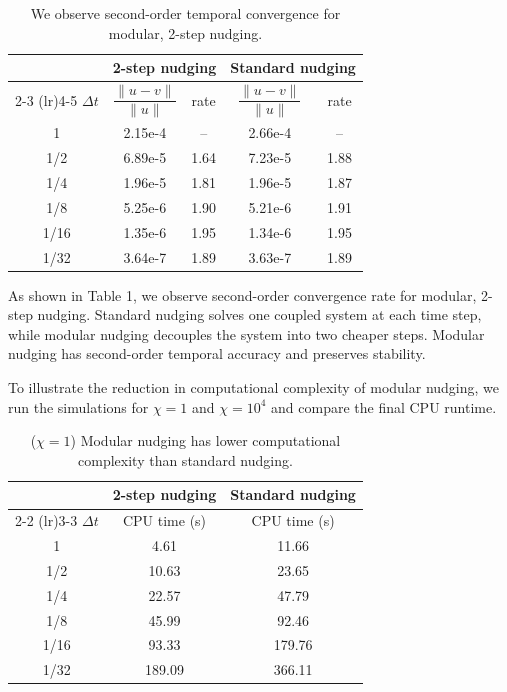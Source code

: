 \documentclass[11pt,a4paper]{article}
\begin{document}
\begin{table}[H]
\centering
\begin{tabular}{||c|cc|cc||}
\toprule
 & \multicolumn{2}{c|}{2-step nudging}
 & \multicolumn{2}{c||}{Standard nudging} \\
\cmidrule(lr){2-3} \cmidrule(lr){4-5}
$\Delta t$
& $\dfrac{\|u-v\|}{\|u\|}$ & rate
& $\dfrac{\|u-v\|}{\|u\|}$ & rate \\
\midrule
1     & 2.15e-4 & -- & 2.66e-4 & -- \\
1/2   & 6.89e-5 & 1.64 & 7.23e-5 & 1.88 \\
1/4   & 1.96e-5 & 1.81 & 1.96e-5 & 1.87 \\
1/8   & 5.25e-6 & 1.90 & 5.21e-6 & 1.91 \\
1/16  & 1.35e-6 & 1.95 & 1.34e-6 & 1.95 \\
1/32  & 3.64e-7 & 1.89 & 3.63e-7 & 1.89 \\
\bottomrule
\end{tabular}
\caption{We observe second-order temporal convergence for modular, 2-step nudging.}
\end{table}

As shown in Table 1, we observe second-order convergence rate for modular, 2-step nudging. Standard nudging solves one coupled system at each time step, while modular nudging decouples the system into two cheaper steps. Modular nudging has second-order temporal accuracy and preserves stability.

To illustrate the reduction in computational complexity of modular nudging, we run the simulations for $\chi=1$ and $\chi=10^4$ and compare the final CPU runtime.

\begin{table}[H]
\centering
\begin{tabular}{||c|c|c||}
\toprule
 & \multicolumn{1}{c|}{2-step nudging}
 & \multicolumn{1}{c||}{Standard nudging} \\
\cmidrule(lr){2-2} \cmidrule(lr){3-3}
$\Delta t$
& CPU time (s)
& CPU time (s) \\
\midrule
1     & 4.61 & 11.66 \\
1/2   & 10.63 & 23.65 \\
1/4   & 22.57 & 47.79 \\
1/8   & 45.99 & 92.46 \\
1/16  & 93.33 & 179.76 \\
1/32  & 189.09 & 366.11 \\
\bottomrule
\end{tabular}
\caption{($\chi=1$) Modular
nudging has lower computational complexity than standard nudging.}
\end{table}
\end{document}
